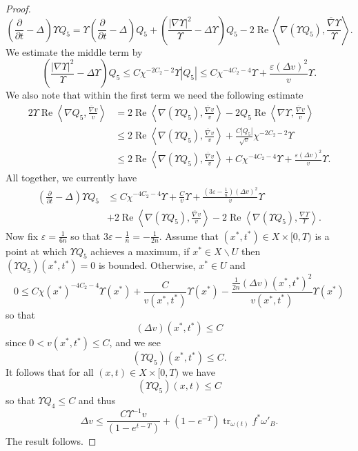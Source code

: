 \documentclass[12pt]{article}
\numberwithin{equation}{section}
\renewcommand{\d}{\partial}
\newcommand{\e}{\varepsilon}
\DeclareMathOperator{\tr}{tr}
\DeclareMathOperator{\Real}{Re}
\newcommand{\oo}[1]{\overline{#1}}
\newcommand{\parabolic}[1]{\left(\frac{\d}{\d t} - \Delta_{#1}\right)}
\newcommand{\ip}[1]{\left\langle#1\right\rangle}
\begin{document}
\begin{proof}
\begin{equation*}
    \parabolic{} \Upsilon Q_5 = \Upsilon \parabolic{} Q_5 + \left(\frac{|\nabla \Upsilon|^2}{\Upsilon} - \Delta \Upsilon\right) Q_5 - 2 \Real \ip{\nabla(\Upsilon Q_5), \frac{\oo{\nabla} \Upsilon}{\Upsilon}}.
\end{equation*}
We estimate the middle term by
\begin{equation*}
    \left(\frac{|\nabla \Upsilon|^2}{\Upsilon} - \Delta \Upsilon\right) Q_5 \leq C\chi^{-2C_2-2}\Upsilon |Q_5| \leq C\chi^{-4C_2-4}\Upsilon + \frac{\e(\Delta v)^2}{v}\Upsilon.
\end{equation*}
We also note that within the first term we need the following estimate
\begin{align*}
    2 \Upsilon \Real \ip{\nabla Q_5, \frac{\oo{\nabla}v}{v}} &= 2 \Real \ip{\nabla (\Upsilon Q_5), \frac{\oo{\nabla}v}{v}} - 2Q_5 \Real \ip{\nabla \Upsilon, \frac{\oo{\nabla}v}{v}}\\
    &\leq 2 \Real \ip{\nabla (\Upsilon Q_5), \frac{\oo{\nabla}v}{v}} + \frac{C|Q_5|}{\sqrt{v}} \chi^{-2C_2-2} \Upsilon\\
    &\leq 2 \Real \ip{\nabla(\Upsilon Q_5), \frac{\oo{\nabla}v}{v}} + C\chi^{-4C_2-4}\Upsilon + \frac{\e(\Delta v)^2}{v}\Upsilon.
\end{align*}
All together, we currently have
\begin{align*}
    \parabolic{} \Upsilon Q_5 &\leq C\chi^{-4C_2-4}\Upsilon+ \frac{C}{v}\Upsilon + \frac{(3\e-\frac{1}{n})(\Delta v)^2}{v}\Upsilon\\
    &+ 2 \Real \ip{\nabla(\Upsilon Q_5), \frac{\oo{\nabla}v}{v}}-2 \Real \ip{\nabla(\Upsilon Q_5), \frac{\nabla \Upsilon}{\Upsilon}}.
\end{align*}
Now fix $\e = \frac{1}{6n}$ so that $3\e - \frac{1}{n} = -\frac{1}{2n}$. Assume that $(x^*,t^*) \in X \times [0,T)$ is a point at which $\Upsilon Q_5$ achieves a maximum, if $x^* \in X \backslash U$ then $(\Upsilon Q_5)(x^*,t^*) = 0$ is bounded. Otherwise, $x^* \in U$ and
\begin{equation*}
    0 \leq  C \chi(x^*)^{-4C_2-4}\Upsilon(x^*)+ \frac{C}{v(x^*,t^*)}\Upsilon(x^*) - \frac{\frac{1}{2n}(\Delta v)(x^*,t^*)^2}{v(x^*,t^*)}\Upsilon(x^*)
\end{equation*}
so that
\begin{equation*}
    (\Delta v)(x^*,t^*) \leq C
\end{equation*}
since $0 < v(x^*,t^*) \leq C$, and we see
\begin{equation*}
    (\Upsilon Q_5)(x^*,t^*) \leq C.
\end{equation*}
It follows that for all $(x,t) \in X \times [0,T)$ we have
\begin{equation*}
    (\Upsilon Q_5)(x,t) \leq C
\end{equation*}
so that $\Upsilon Q_4 \leq C$ and thus
\begin{equation*}
    \Delta v \leq \frac{C\Upsilon^{-1}v}{(1-e^{t-T})} + (1-e^{-T})\tr_{\omega(t)} f^*\omega'_B.
\end{equation*}
The result follows.
\end{proof}
\end{document}
